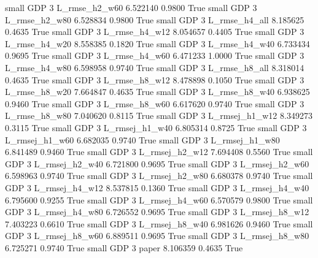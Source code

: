      small      GDP                 3  L_rmse_h2_w60   6.522140      0.9800    True
     small      GDP                 3  L_rmse_h2_w80   6.528834      0.9800    True
     small      GDP                 3  L_rmse_h4_all   8.185625      0.4635    True
     small      GDP                 3  L_rmse_h4_w12   8.054657      0.4405    True
     small      GDP                 3  L_rmse_h4_w20   8.558385      0.1820    True
     small      GDP                 3  L_rmse_h4_w40   6.733434      0.9695    True
     small      GDP                 3  L_rmse_h4_w60   6.471233      1.0000    True
     small      GDP                 3  L_rmse_h4_w80   6.598958      0.9740    True
     small      GDP                 3  L_rmse_h8_all   8.318014      0.4635    True
     small      GDP                 3  L_rmse_h8_w12   8.478898      0.1050    True
     small      GDP                 3  L_rmse_h8_w20   7.664847      0.4635    True
     small      GDP                 3  L_rmse_h8_w40   6.938625      0.9460    True
     small      GDP                 3  L_rmse_h8_w60   6.617620      0.9740    True
     small      GDP                 3  L_rmse_h8_w80   7.040620      0.8115    True
     small      GDP                 3 L_rmsej_h1_w12   8.349273      0.3115    True
     small      GDP                 3 L_rmsej_h1_w40   6.805314      0.8725    True
     small      GDP                 3 L_rmsej_h1_w60   6.682035      0.9740    True
     small      GDP                 3 L_rmsej_h1_w80   6.841489      0.9460    True
     small      GDP                 3 L_rmsej_h2_w12   7.694408      0.5560    True
     small      GDP                 3 L_rmsej_h2_w40   6.721800      0.9695    True
     small      GDP                 3 L_rmsej_h2_w60   6.598963      0.9740    True
     small      GDP                 3 L_rmsej_h2_w80   6.680378      0.9740    True
     small      GDP                 3 L_rmsej_h4_w12   8.537815      0.1360    True
     small      GDP                 3 L_rmsej_h4_w40   6.795600      0.9255    True
     small      GDP                 3 L_rmsej_h4_w60   6.570579      0.9800    True
     small      GDP                 3 L_rmsej_h4_w80   6.726552      0.9695    True
     small      GDP                 3 L_rmsej_h8_w12   7.403223      0.6610    True
     small      GDP                 3 L_rmsej_h8_w40   6.981626      0.9460    True
     small      GDP                 3 L_rmsej_h8_w60   6.889511      0.9695    True
     small      GDP                 3 L_rmsej_h8_w80   6.725271      0.9740    True
     small      GDP                 3          paper   8.106359      0.4635    True
